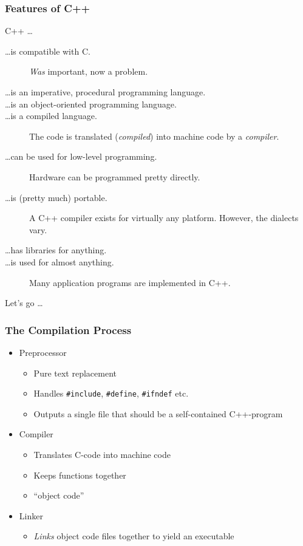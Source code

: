 \documentclass{slides}
\begin{document}
\begin{frame}
  \frametitle{Features of C++}
  C++ \dots
  \begin{description}
  \item[\dots is compatible with C.] \emph{Was} important, now a problem.
  \item[\dots is an imperative, procedural programming language.]
  \item[\dots is an object-oriented programming language.]
  \item[\dots is a compiled language.] The code is translated (\textit{compiled}) into machine code
    by a \textit{compiler}.
  \item[\dots can be used for low-level programming.] Hardware can be programmed pretty directly.
  \item[\dots is (pretty much) portable.] A C++ compiler exists for virtually any platform. However,
    the dialects vary.
  \item[\dots has libraries for anything.] 
  \item[\dots is used for almost anything.] Many application programs are implemented in C++.
  \end{description}
\end{frame}

\begin{frame}
  \vfill
  \centering
  \Huge Let's go \dots
  \vfill
\end{frame}

\begin{frame}[fragile]
  \frametitle{The Compilation Process}
  
  \begin{itemize}
  \item Preprocessor
    \begin{itemize}
    \item Pure text replacement
    \item Handles \lstinline!#include!, \lstinline!#define!,
      \lstinline!#ifndef! etc.
    \item Outputs a single file that should be a self-contained
      C++-program
    \end{itemize}
  \item Compiler
    \begin{itemize}
    \item Translates C-code into machine code 
    \item Keeps functions together
    \item ``object code''
    \end{itemize}
  \item Linker
    \begin{itemize}
    \item \emph{Links} object code files together to yield an
      executable
    \end{itemize}
  \end{itemize}
\end{frame}
\end{document}
